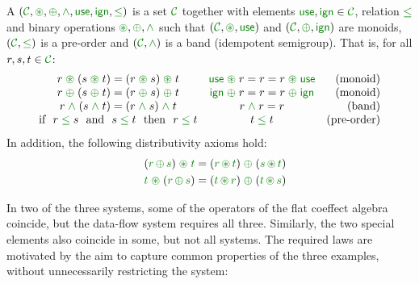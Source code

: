 \begin{definition}
A \emph{} $(\C, \cseq, \cpar, \czip, \cunit, \czero, \cleq)$ is a set 
$\C$ together with elements $\cunit, \czero \in \C$, relation $\cleq$ and binary operations 
$\cseq, \cpar, \czip$ such that $(\C, \cseq, \cunit)$ and $(\C, \cpar, \czero)$ are monoids,
$(\C, \cleq)$ is a pre-order and $(\C, \czip)$ is a band (idempotent semigroup). That is, 
for all $r,s,t\in \C$:
%
\begin{equation*}
\begin{array}{ccr}
r \;\cseq\; (s \;\cseq\; t) = (r \;\cseq\; s) \;\cseq\; t  &
\cunit \;\cseq\; r = r = r \;\cseq\; \cunit &
\textnormal{(monoid)}   
\\
r \;\cpar\; (s \;\cpar\; t) = (r \;\cpar\; s) \;\cpar\; t &
\czero \;\cpar\; r = r = r \;\cpar\; \czero &
\textnormal{(monoid)}   
\\
r \;\czip\; (s \;\czip\; t) = (r \;\czip\; s) \;\czip\; t &
r\; \czip\; r = r &
\textnormal{(band)}   
\\
\textnormal{if}~~r\; \cleq\; s ~~\textnormal{and}~~s\; \cleq\; t~~\textnormal{then}~~r\; \cleq\; t&
t\; \cleq\; t &
\textnormal{(pre-order)}   
\end{array}
\end{equation*}
%
In addition, the following distributivity axioms hold:
\begin{align*}
\quad (\cclrd{r}\, \cpar\, \cclrd{s}) \;\cseq\; \cclrd{t} & = (\cclrd{r} \,\cseq\, \cclrd{t}) \;\cpar\; (\cclrd{s}\, \cseq\, \cclrd{t}) \\
\quad \cclrd{t} \;\cseq\; (\cclrd{r}\, \cpar\, \cclrd{s}) & = (\cclrd{t} \,\cseq\, \cclrd{r}) \;\cpar\; (\cclrd{t}\, \cseq\, \cclrd{s})
\end{align*}
\end{definition}

\noindent
In two of the three systems, some of the operators of the flat coeffect algebra coincide,
but the data-flow system requires all three. Similarly, the two special elements also 
coincide in some, but not all systems. The required laws are motivated by the aim to capture
common properties of the three examples, without unnecessarily restricting the system:

